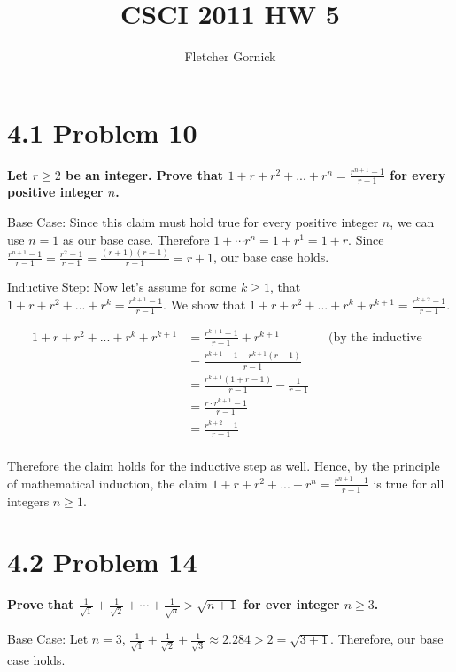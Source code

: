 \documentclass[10pt]{article}
\title{CSCI 2011 HW 5}
\author{Fletcher Gornick}
\def \n {\par \vspace{\baselineskip}}
\begin{document}
\maketitle

\section{4.1 Problem 10}
\textbf{Let $r \geq 2$ be an integer.  Prove that $1 + r + r^2 + ... + r^n = \frac{r^{n+1} - 1}{r - 1}$ for every positive integer $n$.}

\n
Base Case: Since this claim must hold true for every positive integer $n$, we can use $n = 1$ as our base case.  
Therefore $1 + \cdots r^n = 1 + r^1 = 1 + r$.  Since $\frac{r^{n+1} - 1}{r - 1} = \frac{r^2 - 1}{r - 1} = \frac{(r+1)(r-1)}{r-1} = r + 1$,
our base case holds.

\n
Inductive Step: Now let's assume for some $k \geq 1$, that $1 + r + r^2 + ... + r^k = \frac{r^{k+1} - 1}{r - 1}$.  We show that
$1 + r + r^2 + ... + r^k + r^{k+1} = \frac{r^{k+2} - 1}{r - 1}$.

\begin{align*}
    && 1 + r + r^2 + ... + r^k + r^{k+1} &= \frac{r^{k+1} - 1}{r - 1} + r^{k+1} && \text{(by the inductive hypothesis)} \\
    && &= \frac{r^{k+1} - 1 + r^{k+1}(r-1)}{r - 1} \\
    && &= \frac{r^{k+1}(1 + r - 1)}{r - 1} - \frac{1}{r - 1} && \\
    && &= \frac{r \cdot r^{k+1} - 1}{r - 1} && \\
    && &= \frac{r^{k+2} - 1}{r - 1} && \\
\end{align*}

Therefore the claim holds for the inductive step as well.  Hence, by the principle of mathematical induction, the claim 
$1 + r + r^2 + ... + r^n = \frac{r^{n+1} - 1}{r - 1}$ is true for all integers $n \geq 1$.


\section{4.2 Problem 14}
\textbf{Prove that $\frac{1}{\sqrt{1}} + \frac{1}{\sqrt{2}} + \cdots + \frac{1}{\sqrt{n}} > \sqrt{n + 1}$ for ever integer $n \geq 3$.}

\n
Base Case: Let $n = 3$, $\frac1{\sqrt1} + \frac1{\sqrt2} + \frac1{\sqrt3} \approx 2.284 > 2 = \sqrt{3 + 1}$.  Therefore, our base case holds.
\end{document}

